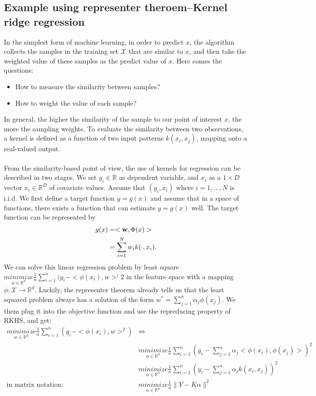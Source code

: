 \subsection{Example using representer theroem--Kernel ridge regression}
In the simplest form of machine learning, in order to predict $x$, the algorithm collects the samples in the training set $\mathcal{X}$ that are similar to $x$, 
and then take the weighted value of these samples as the predict value of $x$. Here comes the questions:
\begin{itemize}
    \item How to measure the similarity between samples?
    \item How to weight the value of each sample?
\end{itemize} 
In general, the higher the similarity of the sample to our point of interest $x$, the more the sampling weights. To evaluate the similarity between two observations, 
a kernel is defined as a function of two input patterns $k(x_i, x_j)$, mapping onto a real-valued output.
\\ \\
From the similarity-based point of view, the use of kernels for regression can be described in two stages. We set $y_i \in \mathbb{R}$ as dependent variable, 
and $x_i$ as a $1 \times D$ vector $x_i \in \mathbb{R}^D$ of covariate values. Assume that $(y_i, x_i)$ where $i = 1, \dots, N$ is i.i.d. We first define a target function $y=g(x)$ and assume that in a space of functions, there exists 
a function that can estimate $y=g(x)$ well. The target function can be represented by
\begin{align}
    g(x)&= <\textbf{w},\Phi(x)>\notag\\
        &=\sum_{i=1}^N w_i k(\cdot,x_i).
\end{align}
We can solve this linear regression problem by least square $\underset{w\in\mathbb{R}^d}{minimize}\frac{1}{n}\sum_{i=1}^n(y_i-<\phi(x_i),w>^)2$ in the feature space with a mapping $\phi: \mathcal{X}\rightarrow\mathbb{R}^d$. Luckily, the 
representer theorem already tells us that the least squared problem always has a solution of the form $w^{*}=\sum_{j=1}^n\alpha_j\phi(x_j)$. We them plug it into the objective function and use the repreducing property of RKHS, and get:
\begin{align*}
    \underset{w\in\mathbb{R}^d}{minimize}\frac{1}{n}\sum_{i=1}^n(y_i-<\phi(x_i),w>^2)&\Leftrightarrow\\
                                                                                     &\underset{\alpha\in\mathbb{R}^n}{minimize}\frac{1}{n}\sum_{i=1}^n(y_i-\sum_{j=1}^n\alpha_j<\phi(x_i),\phi(x_j)>)^2\\
                                                                                     &\underset{\alpha\in\mathbb{R}^n}{minimize}\frac{1}{n}\sum_{i=1}^n(y_i-\sum_{j=1}^n\alpha_j k(x_i,x_j))^2\\
                                                        \text{in matrix notation:}  &\underset{\alpha\in\mathbb{R}^n}{minimize}\frac{1}{n}\parallel Y-K\alpha\parallel^2
\end{align*}
